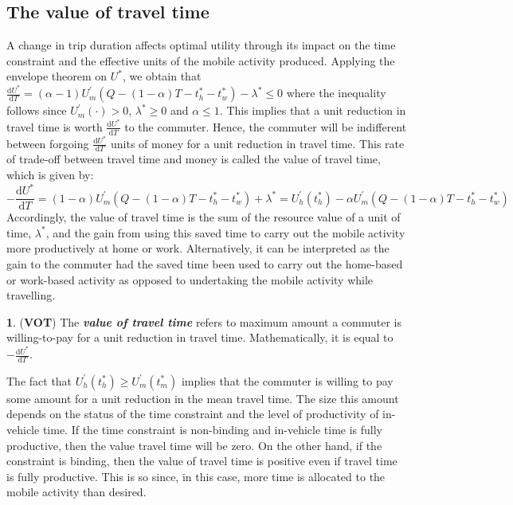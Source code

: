 \documentclass[12pt,a4paper,british]{article}
\theoremstyle{definition}
\newtheorem{defn}{\protect\definitionname}
\theoremstyle{plain}
\theoremstyle{plain}
\theoremstyle{plain}
\providecommand{\definitionname}{Definition}
\begin{document}
\subsection{The value of travel time}

A change in trip duration affects optimal utility through its impact on the time constraint and the effective units of the mobile activity produced. Applying the envelope theorem on $U^{\ast}$, we obtain that $\frac{\mathrm{d}U^{\ast}}{\mathrm{d}T}=\left(\alpha-1\right)U_{m}^{\prime}\left(Q-\left(1-\alpha\right)T-t_{h}^{\ast}-t_{w}^{\ast}\right)-\lambda^{\ast}\leq0$ where the inequality follows since $U_{m}^{\prime}\left(\cdot\right)>0$, $\lambda^{\ast}\geq0$ and $\alpha\leq1$. This implies that a unit reduction in travel time is worth $\frac{\mathrm{d}U^{\ast}}{\mathrm{d}T}$ to the commuter. Hence, the commuter will be indifferent between forgoing
$\frac{\mathrm{d}U^{\ast}}{\mathrm{d}T}$ units of money for a unit reduction in travel time. This rate of trade-off between travel time
and money is called the value of travel time, which is given by:%
\begin{equation}
-\frac{\mathrm{d}U^{\ast}}{\mathrm{d}T}=\left(1-\alpha\right)U_{m}^{\prime}\left(Q-\left(1-\alpha\right)T-t_{h}^{\ast}-t_{w}^{\ast}\right)+\lambda^{\ast}=U_{h}^{\prime}\left(t_{h}^{*}\right)-\alpha U_{m}^{\prime}\left(Q-\left(1-\alpha\right)T-t_{h}^{\ast}-t_{w}^{\ast}\right)\label{eq:VOT_det}
\end{equation}
Accordingly, the value of travel time is the sum of the resource value of a unit of time, $\lambda^{\ast}$, and the gain from using this
saved time to carry out the mobile activity more productively at home or work. Alternatively, it can be interpreted as the gain to the commuter had the saved time been used to carry out the home-based or work-based activity as opposed to undertaking the mobile activity while travelling.

\begin{defn}
(\textbf{VOT}) The \textbf{\textit{value of travel time}} refers to
maximum amount a commuter is willing-to-pay for a unit reduction in
travel time. Mathematically, it is equal to $-\frac{\mathrm{d}U^{\ast}}{\mathrm{d}T}$.
\end{defn}

The fact that $U_{h}^{\prime}\left(t_{h}^{*}\right)\geq U_{m}^{\prime}\left(t_{m}^{\ast}\right)$ implies that the commuter is willing to pay some amount for a unit reduction in the mean travel time. The size this amount depends on the status of the time constraint and the level of productivity of in-vehicle time. If the time constraint is non-binding and in-vehicle time is fully productive, then the value travel time will be zero. On the other hand, if the constraint is binding, then the value of travel time is positive even if travel time is fully productive. This is so since, in this case, more time is allocated to the mobile activity than desired. 
\end{document}
